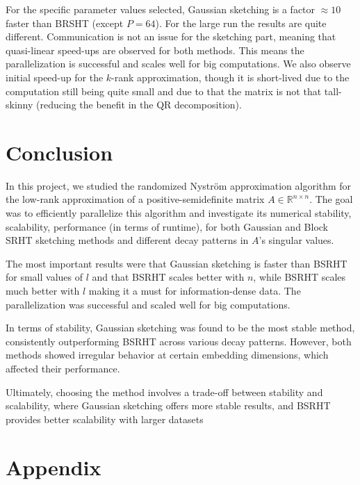 \documentclass[a4paper, 12pt,oneside]{article}
\begin{document}
			For the specific parameter values selected, Gaussian sketching is a factor $\approx 10$ faster than BRSHT (except $P=64$).
			For the large run the results are quite different. Communication is not an issue for the sketching part, meaning that quasi-linear speed-ups are observed for both methods. This means the parallelization is successful and scales well for big computations. We also observe initial speed-up for the $k$-rank approximation, though it is short-lived due to the computation still being quite small and due to that the matrix is not that tall-skinny (reducing the benefit in the QR decomposition). 
	\section{Conclusion}
	In this project, we studied the randomized Nystr\"om approximation algorithm for the low-rank approximation of a positive-semidefinite matrix $A \in \mathbb{R}^{n \times n}$. The goal was to efficiently parallelize this algorithm and investigate its numerical stability, scalability, performance (in terms of runtime), for both Gaussian and Block SRHT sketching methods and different decay patterns in $A$'s singular values. 

	
	The most important results were that Gaussian sketching is faster than BSRHT for small values of $l$ and that BSRHT scales better with $n$, while BSRHT scales much better with $l$ making it a must for information-dense data. The parallelization was successful and scaled well for big computations. 
	
	In terms of stability, Gaussian sketching was found to be the most stable method, consistently outperforming BSRHT across various decay patterns. However, both methods showed irregular behavior at certain embedding dimensions, which affected their performance. 
	
	Ultimately, choosing the method involves a trade-off between stability and scalability, where Gaussian sketching offers more stable results, and BSRHT provides better scalability with larger datasets
\newpage
	\section{Appendix}
\end{document}
